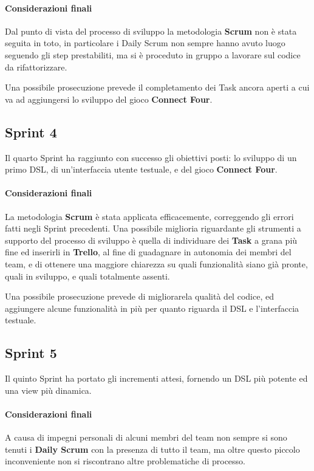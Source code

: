\paragraph{Considerazioni finali}
Dal punto di vista del processo di sviluppo la metodologia \textbf{Scrum} non è stata seguita in toto, in particolare i Daily Scrum non sempre hanno avuto luogo seguendo gli step prestabiliti, ma si è proceduto in gruppo a lavorare sul codice da rifattorizzare.

Una possibile prosecuzione prevede il completamento dei Task ancora aperti a cui va ad aggiungersi lo sviluppo del gioco \textbf{Connect Four}.

\subsection{Sprint 4}
Il quarto Sprint ha raggiunto con successo gli obiettivi posti: lo sviluppo di un primo DSL, di un'interfaccia utente testuale, e del gioco \textbf{Connect Four}.
\paragraph{Considerazioni finali}
La metodologia \textbf{Scrum} è stata applicata efficacemente, correggendo gli errori fatti negli Sprint precedenti.
%
Una possibile miglioria riguardante gli strumenti a supporto del processo di sviluppo è quella di individuare dei \textbf{Task} a grana più fine ed inserirli in \textbf{Trello}, al fine di guadagnare in autonomia dei membri del team, e di ottenere una maggiore chiarezza su quali funzionalità siano già pronte, quali in sviluppo, e quali totalmente assenti.

Una possibile prosecuzione prevede di migliorarela qualità del codice, ed aggiungere alcune funzionalità in più per quanto riguarda il DSL e l'interfaccia testuale.

\subsection{Sprint 5}
Il quinto Sprint ha portato gli incrementi attesi, fornendo un DSL più potente ed una view più dinamica.
\paragraph{Considerazioni finali}
A causa di impegni personali di alcuni membri del team non sempre si sono tenuti i \textbf{Daily Scrum} con la presenza di tutto il team, ma oltre questo piccolo inconveniente non si riscontrano altre problematiche di processo.

